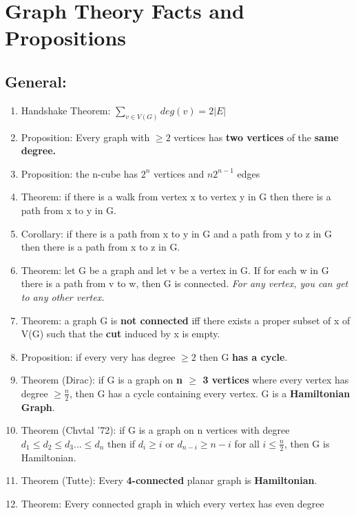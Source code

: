 \documentclass[]{article}
\author{}
\date{}
\begin{document}
\section{Graph Theory Facts and
Propositions}\label{graph-theory-facts-and-propositions}

\subsection{General:}\label{general}

\begin{enumerate}
\def\labelenumi{\arabic{enumi}.}
\itemsep1pt\parskip0pt
\item
  Handshake Theorem: $\sum_{v \in V(G)} deg(v) = 2|E|$
\item
  Proposition: Every graph with $\geq 2$ vertices has \textbf{two
  vertices} of the \textbf{same degree.}
\item
  Proposition: the n-cube has $2^n$ vertices and $n2^{n-1}$ edges
\item
  Theorem: if there is a walk from vertex x to vertex y in G then there
  is a path from x to y in G.
\item
  Corollary: if there is a path from x to y in G and a path from y to z
  in G then there is a path from x to z in G.
\item
  Theorem: let G be a graph and let v be a vertex in G. If for each w in
  G there is a path from v to w, then G is connected. \emph{For any
  vertex, you can get to any other vertex.}
\item
  Theorem: a graph G is \textbf{not connected} iff there exists a proper
  subset of x of V(G) such that the \textbf{cut} induced by x is empty.
\item
  Proposition: if every very has degree $\geq 2$ then G \textbf{has a
  cycle}.
\item
  Theorem (Dirac): if G is a graph on \textbf{n $\geq$ 3 vertices} where
  every vertex has degree $\geq \frac{n}{2}$, then G has a cycle
  containing every vertex. G is a \textbf{Hamiltonian Graph}.
\item
  Theorem (Chvtal '72): if G is a graph on n vertices with degree
  $d_1 \leq d_2 \leq d_3 ... \leq d_n$ then if $d_i \geq i$ or
  $d_{n-i} \geq n - i$ for all $i \leq \frac{n}{2}$, then G is
  Hamiltonian.
\item
  Theorem (Tutte): Every \textbf{4-connected} planar graph is
  \textbf{Hamiltonian}.
\item
  Theorem: Every connected graph in which every vertex has even degree

\end{enumerate}
\end{document}
